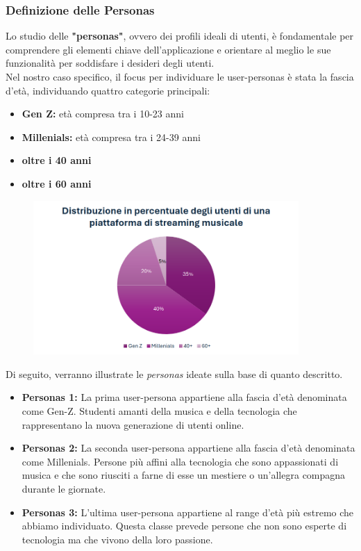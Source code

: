 \documentclass{article}
\begin{document}
			\subsubsection{Definizione delle Personas}
			Lo studio delle \textbf{"personas"}, ovvero dei profili ideali di utenti, è fondamentale per comprendere gli elementi chiave dell'applicazione e orientare al meglio le sue funzionalità per soddisfare i desideri degli utenti.\\Nel nostro caso specifico, il focus per individuare le user-personas è stata la fascia d'età, individuando quattro categorie principali:
			
			\begin{itemize}
				\item \textbf{Gen Z:} età compresa tra i 10-23 anni
				\item \textbf{Millenials:} età compresa tra i 24-39 anni
				\item \textbf{oltre i 40 anni}
				\item \textbf{oltre i 60 anni}
			\end{itemize}
			
			\begin{center}
				\begin{figure}[H]
					\centering
					\includegraphics[width=0.9\textwidth]{Immagini/dati.png}
				\end{figure}
			\end{center}
			Di seguito, verranno illustrate le \textit{personas} ideate sulla base di quanto descritto.
			\begin{itemize}
				\item \textbf{Personas 1:} La prima user-persona appartiene alla fascia d'età denominata come Gen-Z. Studenti amanti della musica e della tecnologia che rappresentano la nuova generazione di utenti online.
				\item \textbf{Personas 2:} La seconda user-persona appartiene alla fascia d'età denominata come Millenials. Persone più affini alla tecnologia che sono appassionati di musica e che sono riusciti a farne di esse un mestiere o un'allegra compagna durante le giornate.
				\item \textbf{Personas 3:} L'ultima user-persona appartiene al range d'età più estremo che abbiamo individuato. Questa classe prevede persone che non sono esperte di tecnologia ma che vivono della loro passione.
			\end{itemize}
			
			
			
				
\end{document}
